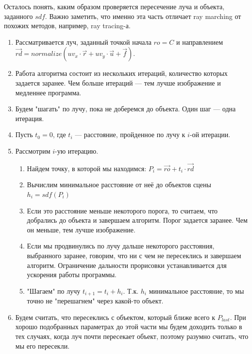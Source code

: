 \documentclass[12pt,a4paper]{article}
\begin{document}
Осталось понять, каким образом проверяется пересечение луча и объекта, заданного
$sdf$. Важно заметить, что именно эта часть отличает ray marching от похожих
методов, например, ray tracing-а.
\begin{enumerate}
    \item Рассматривается луч, заданный точкой начала $ro = C$ и
        направлением $\vec{rd} = normalize(uv_x \cdot \vec{r} + uv_y \cdot
        \vec{u} + \vec{f})$.
    \item Работа алгоритма состоит из нескольких итераций, количество которых
        задается заранее. Чем больше итераций --- тем лучше изображение и
        медленнее программа.
    \item Будем "шагать" по лучу, пока не доберемся до объекта. Один шаг ---
        одна итерация.
    \item Пусть $t_0 = 0$, где $t_i$ --- расстояние, пройденное по лучу к $i$-ой
        итерации.
    \item Рассмотрим $i$-ую итерацию.
    \begin{enumerate}
        \item Найдем точку, в которой мы находимся: $P_i = \vec{ro} + t_i
            \cdot \vec{rd}$
        \item Вычислим минимальное расстояние от неё до объектов сцены $h_i =
        sdf\left(P_i\right)$
        \item Если это расстояние меньше некоторого порога, то считаем, что
            добрались до объекта и завершаем алгоритм. Порог задается заранее.
            Чем он меньше, тем лучше изображение.
        \item Если мы продвинулись по лучу дальше некоторого расстояния,
            выбранного заранее, говорим, что ни с чем не пересеклись и завершаем
            алгоритм. Ограничение дальности прорисовки устанавливается для
            ускорения работы программы.
        \item "Шагаем" по лучу $t_{i + 1} = t_i + h_i$. Т.к. $h_i$ минимальное
            расстояние, то мы точно не "перешагнем" через какой-то объект.
    \end{enumerate}
    \item Будем считать, что пересеклись с объектом, который ближе всего к
        $P_{last}$. При хорошо подобранных параметрах до этой части мы будем
        доходить только в тех случаях, когда луч почти пересекает объект,
        поэтому разумно считать, что мы его пересекли.
\end{enumerate}
\end{document}
